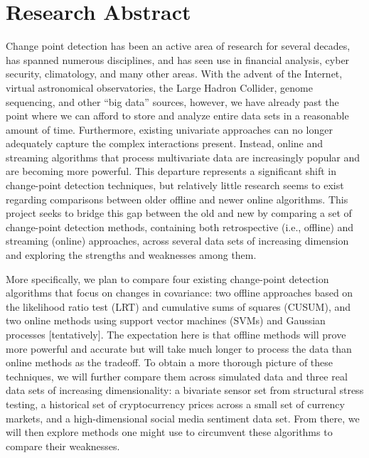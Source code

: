 \documentclass[10pt,letterpaper]{article}
\begin{document}
\maketitle

\section{Research Abstract}

Change point detection has been an active area of research for several decades, has spanned numerous disciplines, and has seen use in financial analysis, cyber security, climatology, and many other areas.
With the advent of the Internet, virtual astronomical observatories, the Large Hadron Collider, genome sequencing, and other ``big data'' sources, however, we have already past the point where we can afford to store and analyze entire data sets in a reasonable amount of time.
Furthermore, existing univariate approaches can no longer adequately capture the complex interactions present.
Instead, online and streaming algorithms that process multivariate data are increasingly popular and are becoming more powerful.
This departure represents a significant shift in change-point detection techniques, but relatively little research seems to exist regarding comparisons between older offline and newer online algorithms.
This project seeks to bridge this gap between the old and new by comparing a set of change-point detection methods, containing both retrospective (i.e., offline) and streaming (online) approaches, across several data sets of increasing dimension and exploring the strengths and weaknesses among them.

More specifically, we plan to compare four existing change-point detection algorithms that focus on changes in covariance: two offline approaches based on the likelihood ratio test (LRT) and cumulative sums of squares (CUSUM), and two online methods using support vector machines (SVMs) and Gaussian processes [tentatively].
The expectation here is that offline methods will prove more powerful and accurate but will take much longer to process the data than online methods as the tradeoff.
To obtain a more thorough picture of these techniques, we will further compare them across simulated data and three real data sets of increasing dimensionality: a bivariate sensor set from structural stress testing, a historical set of cryptocurrency prices across a small set of currency markets, and a high-dimensional social media sentiment data set.
From there, we will then explore methods one might use to circumvent these algorithms to compare their weaknesses.
\end{document}
